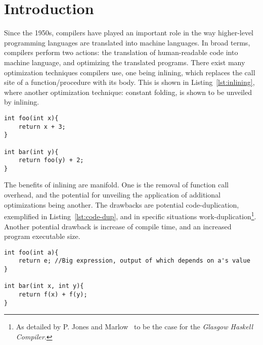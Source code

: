 
\section{Introduction}
\label{introduction}

Since the 1950s, compilers have played an important role in the way higher-level
programming languages are translated into machine languages. In broad terms,
compilers perform two actions: the translation of human-readable code into
machine language, and optimizing the translated programs. There exist many
optimization techniques compilers use, one being inlining, which replaces the
call site of a function/procedure with its body. This is shown in
Listing~\ref{lst:inlining}, where another optimization technique: constant
folding, is shown to be unveiled by inlining.

\begin{lstlisting}[label={lst:inlining}, style=customcpp,
caption={Function \textit{foo()} inlined into function \textit{bar()} would
result in the body of \textit{bar()} being \textit{return x + 3 + 2}, in which
case constant folding can be used, replacing the \textit{return} expression of
\textit{bar()} with : \textit{x + 5}.}]
int foo(int x){
	return x + 3;
}

int bar(int y){
	return foo(y) + 2;
}
\end{lstlisting}
\vspace{-4\parskip} %

The benefits of inlining are manifold. One is the removal of function call
overhead, and the potential for unveiling the application of additional
optimizations being another. The drawbacks are potential code-duplication,
exemplified in Listing~\ref{lst:code-dup}, and in specific situations
work-duplication\footnote{As detailed by P. Jones and Marlow~\cite{GHCPaper} to
be the case for the \textit{Glasgow Haskell Compiler}.}. Another potential
drawback is increase of compile time, and an increased program executable size.

\begin{lstlisting}[label={lst:code-dup}, style=customcpp,
caption={Code duplication in \textit{bar()}, when inlining \textit{foo()} into
\textit{bar()}. The big expression \textit{e} in \textit{foo()}, would be
duplicated when inlined into \textit{bar()}. The cost of function call overhead
would be replaced with an increased size of the final program. However, in this
example, the potential for \textit{Common Subexpression Elimination} (CSE) is
likely able to negate some of the program size increase.}]
int foo(int a){
	return e; //Big expression, output of which depends on a's value
}

int bar(int x, int y){
	return f(x) + f(y);
}
\end{lstlisting}
\vspace{-4\parskip} %

